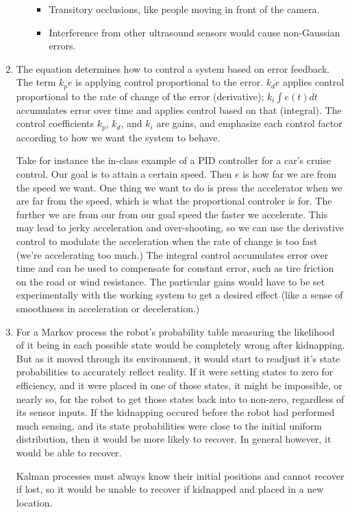 \documentclass[letter,8pt]{article}
\begin{document}
\begin{enumerate}
\begin{itemize}
\begin{itemize}
      \item Transitory occlusions, like people moving in front of the camera.
      \item Interference from other ultrasound sensors would cause non-Gaussian errors.
      \end{itemize}
  \end{itemize}
  \item The equation determines how to control a system based on error feedback. The term $k_pe$
    is applying control proportional to the error. $k_d\dot{e}$
    applies control proportional to the rate of change of the error (derivative); $k_i\int e(t) dt$
    accumulates error over time and applies control based on that (integral). The control coefficients
    $k_p$, $k_d$, and $k_i$ are gains, and emphasize each control factor according to how we want the system to behave.

    Take for instance
    the in-class example of a PID controller for a car's cruise control. Our goal is to attain
    a certain speed. Then $e$ is how far we are from the speed we want. One thing we want to
    do is press the accelerator when we are far from the speed, which is what the proportional controler is for.
    The further we are from our from our goal speed the faster we accelerate.
    This may lead to jerky acceleration and
    over-shooting, so we can use the derivative control to modulate the acceleration when the
    rate of change is too fast (we're accelerating too much.) The integral control accumulates
    error over time and can be used to compensate for constant error, such as tire friction on the
    road or wind resistance. The particular gains would have to be set experimentally with the working
    system to get a desired effect (like a sense of smoothness in acceleration or deceleration.)

  \item For a Markov process the robot's probability table measuring the likelihood of it being in each possible
    state would be completely wrong after kidnapping. But as it moved through its environment, it would start to readjust
    it's state probabilities to accurately reflect reality. If it were setting states to zero for efficiency, 
    and it were placed in one of those states,
    it might be impossible, or nearly so, for the robot to get those states back into to non-zero,
    regardless of its sensor inputs. If the kidnapping occured before the robot had performed much sensing, and
    its state probabilities were close to the initial uniform distribution, then it would be more likely to
    recover. In general however, it would be able to recover.

    Kalman processes must always know their initial positions and cannot recover if lost, so it would be unable to
    recover if kidnapped and placed in a new location.
\end{enumerate}
\end{document}
